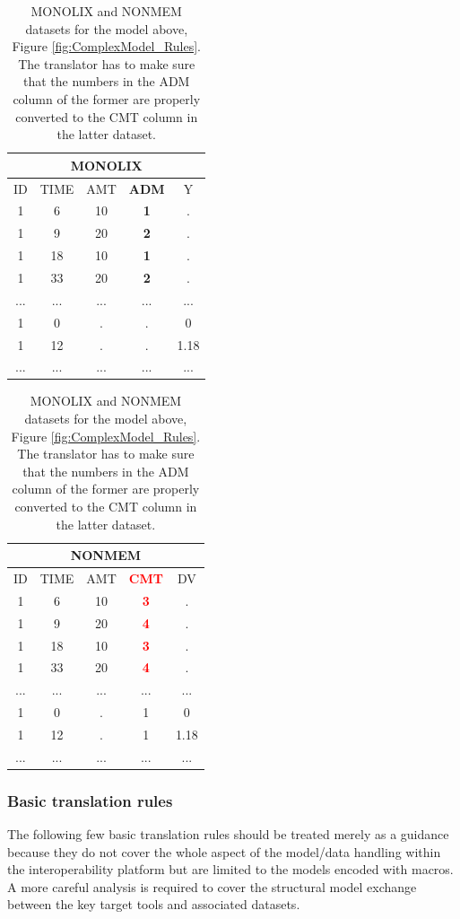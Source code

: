 \begin{table}[h!]
\footnotesize
\parbox{.5\linewidth}{
\centering
\begin{tabular}{ccccc}
  \hline
   \multicolumn{5}{c}{\textbf{MONOLIX}} \\
  \hline
ID	& TIME  & AMT	 & \textbf{ADM}  &	Y \\
  \hline
1	& 6	    & 10	& \textbf{1}	 & . \\
1	& 9	    & 20	& \textbf{2}	 & . \\
1	& 18	    & 10	& \textbf{1}	 & . \\
1	& 33	    & 20	& \textbf{2}	 & . \\
...     &  ...     &  ...     &  ...  & ... \\
1	& 0	    & .	& .	& 0 \\
1	& 12	    & .	& .	& 1.18 \\
...     &  ...     &  ...     & ...  & ...\\
\end{tabular}
}
\hfill
\parbox{.5\linewidth}{
\centering
\begin{tabular}{ccccc}
  \hline
   \multicolumn{5}{c}{\textbf{NONMEM}} \\
  \hline
ID	& TIME  & AMT	 & \textbf{\textcolor{red}{CMT}} &	DV \\
  \hline
1	& 6	    & 10	& \textbf{\textcolor{red}{3}}	 & . \\
1	& 9	    & 20	& \textbf{\textcolor{red}{4}}	 & . \\
1	& 18	    & 10	& \textbf{\textcolor{red}{3}}	 & . \\
1	& 33	    & 20	& \textbf{\textcolor{red}{4}}	 & . \\
...     &  ...     &  ...     &  ...  & ... \\
1	& 0	    & .	& 1	& 0 \\
1	& 12	    & .	& 1	& 1.18 \\
...     &  ...     &  ...     & ...  & ...\\
\end{tabular}
}
\caption{MONOLIX and NONMEM datasets for the model above, Figure 
\ref{fig:ComplexModel_Rules}. The translator has to make sure that the numbers 
in the ADM column of the former are properly converted to the CMT column in the latter dataset.}
\label{tab:C3ModelData}
\end{table}

\subsubsection{Basic translation rules}
The following few basic translation rules should be treated merely as a guidance
because they do not cover the whole aspect of the model/data handling within the 
interoperability platform but are limited to the models encoded with macros. 
A more careful analysis is required to cover the structural model exchange between 
the key target tools and associated datasets.

